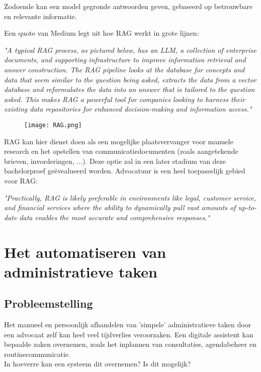 Zodoende kan een model gegronde antwoorden geven, gebaseerd op betrouwbare en relevante informatie.

Een quote van Medium legt uit hoe RAG werkt in grote lijnen:

\begin{displayquote}
	\textit{"A typical RAG process, as pictured below, has an LLM, a collection of enterprise documents, and supporting infrastructure to improve information retrieval and answer construction.
		The RAG pipeline looks at the database for concepts and data that seem similar to the question being asked, extracts the data from a vector database and reformulates the data into
		an answer that is tailored to the question asked. This makes RAG a powerful tool for companies looking to harness their existing data repositories for enhanced decision-making
		and information access."} \autocite{MediumRAG}
	\begin{figure}[h]
		\texttt{[image: RAG.png]}
		\centering
	\end{figure}
\end{displayquote}
\newpage

RAG kan hier dienst doen als een mogelijke plaatsvervanger voor manuele research en het opstellen van communicatiedocumenten (zoals aangetekende brieven, invorderingen, ...). Deze optie zal in
een later stadium van deze bachelorproef geëvealueerd worden. Advocatuur is een heel toepasselijk gebied voor RAG:

\begin{displayquote}
	\textit{"Practically, RAG is likely preferable in environments like
		legal, customer service, and financial services where the ability to
		dynamically pull vast amounts of up-to-date data enables the most accurate and comprehensive responses."} \autocite{MediumRAG}
\end{displayquote}

\section{Het automatiseren van administratieve taken}
\subsection{Probleemstelling}
Het manueel en persoonlijk afhandelen van 'simpele' administratieve taken door een advocaat zelf kan heel veel tijdverlies veroorzaken.
Een digitale assistent kan bepaalde zaken overnemen, zoals het inplannen van consultaties, agendabeheer en routinecommunicatie. \\
In hoeverre kan een systeem dit overnemen? Is dit mogelijk?

